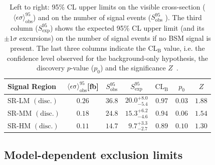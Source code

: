 \begin{table}
\begin{center}
\begin{tabular}{lcccccc}
\toprule
\textbf{Signal Region}                       & $\langle\epsilon{\mathrm{ \sigma}}\rangle_{\mathrm{ obs}}^{95}$[fb]  &  $S_{\mathrm{ obs}}^{95}$  & $S_{\mathrm{ exp}}^{95}$ & $\textrm{CL}_{\textrm{B}}$ & $p_{0}$ & $Z$  \\
\midrule
 SR-LM $\mathrm{(disc.)}$    & $0.26$ &  $36.8$ & $ { 20.0 }^{ +8.0 }_{ -5.4 }$ & $0.97$ & $ 0.03$&$1.88$ \\%
 SR-MM $\mathrm{(disc.)}$    & $0.18$ &  $24.8$ & $ { 15.3 }^{ +6.2 }_{ -4.6 }$ & $0.94$ & $ 0.06$&$1.54$ \\%
 SR-HM $\mathrm{(disc.)}$    & $0.11$ &  $14.7$ & $ { ~~9.7 }^{ +3.3 }_{ -2.7 }$ & $0.89$ & $ 0.10$&$1.30$ \\%

\bottomrule
\end{tabular}
\caption[Breakdown of upper limits.]{
Left to right: 95\% CL upper limits on the visible cross-section
($\langle\epsilon\sigma\rangle_{\mathrm{ obs}}^{95}$) and on the number of
signal events ($S_{\mathrm{ obs}}^{95}$ ). 
The third column ($S_{\mathrm{ exp}}^{95}$) shows the expected 95\% CL upper limit (and its $\pm 1\sigma$ excursions) 
on the number of signal events if no BSM signal is present. 
The last three columns
indicate the $\textrm{CL}_{\textrm{B}}$ value, i.e. the confidence level observed for
the background-only hypothesis, the discovery $p$-value ($p_{0}$) and the significance $Z$~\cite{2008NIMPA.595..480C}.}
\label{tab:upperlimit_toys}
\end{center}
\end{table}


\subsection{Model-dependent exclusion limits}

